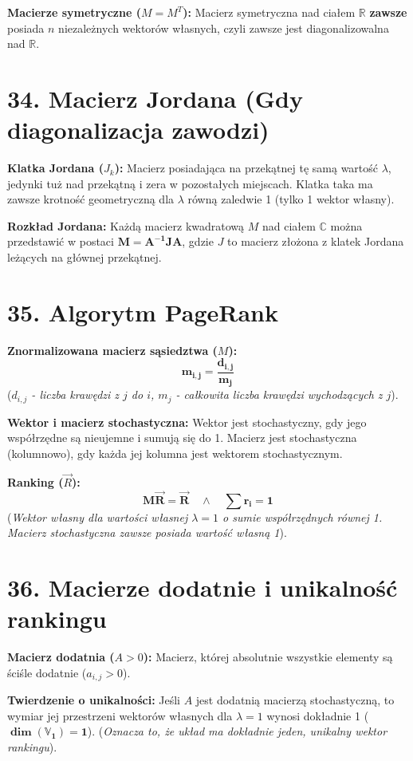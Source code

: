 \documentclass[12pt,a4paper]{article}
\begin{document}
\noindent\textbf{Macierze symetryczne ($M = M^T$):} Macierz symetryczna nad ciałem $\mathbb{R}$ \textbf{zawsze} posiada $n$ niezależnych wektorów własnych, czyli zawsze jest diagonalizowalna nad $\mathbb{R}$. %

\section*{34. Macierz Jordana (Gdy diagonalizacja zawodzi)}
\noindent\textbf{Klatka Jordana ($J_k$):} Macierz posiadająca na przekątnej tę samą wartość $\lambda$, jedynki tuż nad przekątną i zera w pozostałych miejscach. Klatka taka ma zawsze krotność geometryczną dla $\lambda$ równą zaledwie 1 (tylko 1 wektor własny). %

\noindent\textbf{Rozkład Jordana:} Każdą macierz kwadratową $M$ nad ciałem $\mathbb{C}$ można przedstawić w postaci $\mathbf{M = A^{-1} J A}$, gdzie $J$ to macierz złożona z klatek Jordana leżących na głównej przekątnej. %

\section*{35. Algorytm PageRank}
\noindent\textbf{Znormalizowana macierz sąsiedztwa ($M$):} %
$$ \mathbf{m_{i,j} = \frac{d_{i,j}}{m_j}} $$ %
(\textit{$d_{i,j}$ - liczba krawędzi z $j$ do $i$, $m_j$ - całkowita liczba krawędzi wychodzących z $j$}). %

\noindent\textbf{Wektor i macierz stochastyczna:} Wektor jest stochastyczny, gdy jego współrzędne są nieujemne i sumują się do 1. Macierz jest stochastyczna (kolumnowo), gdy każda jej kolumna jest wektorem stochastycznym. %

\noindent\textbf{Ranking ($\vec{R}$):} %
$$ \mathbf{M\vec{R} = \vec{R} \quad \land \quad \sum r_i = 1} $$ %
(\textit{Wektor własny dla wartości własnej $\lambda = 1$ o sumie współrzędnych równej 1. Macierz stochastyczna zawsze posiada wartość własną 1}). %

\section*{36. Macierze dodatnie i unikalność rankingu}
\noindent\textbf{Macierz dodatnia ($A > 0$):} Macierz, której absolutnie wszystkie elementy są ściśle dodatnie ($a_{i,j} > 0$). %

\noindent\textbf{Twierdzenie o unikalności:} Jeśli $A$ jest dodatnią macierzą stochastyczną, to wymiar jej przestrzeni wektorów własnych dla $\lambda=1$ wynosi dokładnie 1 ($\mathbf{\dim(\mathbb{V}_1) = 1}$). %
(\textit{Oznacza to, że układ ma dokładnie jeden, unikalny wektor rankingu}). %
\end{document}
